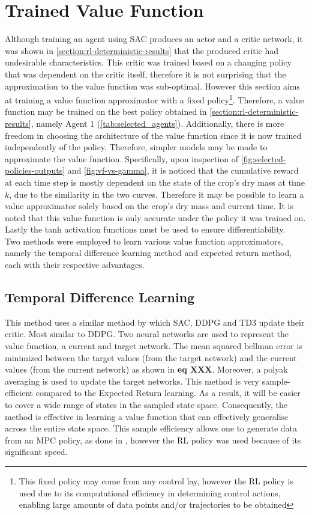 \section{Trained Value Function}
\label{section:trained-vf}

Although training an agent using SAC produces an actor and a critic network, it was shown in \autoref{section:rl-deterministic-results} that the produced critic had undesirable characteristics.
This critic was trained based on a changing policy that was dependent on the critic itself, therefore it is not surprising that the approximation to the value function was sub-optimal. However this section aims at training a value function approximator with a fixed policy\footnote{This fixed policy may come from any control lay, however the RL policy is used due to its computational efficiency in determining control actions, enabling large amounts of data points and/or trajectories to be obtained}. Therefore, a value function may be trained on the best policy obtained in \autoref{section:rl-deterministic-results}, namely Agent 1 (\autoref{tab:selected_agents}). Additionally, there is more freedom in choosing the architecture of the value function since it is now trained independently of the policy. Therefore, simpler models may be made to approximate the value function. Specifically, upon inspection of \autoref{fig:selected-policies-outputs} and \autoref{fig:vf-vs-gamma}, it is noticed that the cumulative reward at each time step is mostly dependent on the state of the crop's dry mass at time $k$, due to the similarity in the two curves. Therefore it may be possible to learn a value approximator solely based on the crop's dry mass and current time. It is noted that this value function is only accurate under the policy it was trained on. Lastly the tanh activation functions must be used to ensure differentiability.\\
Two methods were employed to learn various value function approximators, namely the temporal difference learning method and expected return method, each with their respective advantages.


\subsection{Temporal Difference Learning}
\label{ssection:td-learning}
This method uses a similar method by which SAC, DDPG and TD3 update their critic. Most similar to DDPG. Two neural networks are used to represent the value function, a current and target network. The mean squared bellman error is minimized between the target values (from the target network) and the current values (from the current network) as shown in \textbf{eq XXX}. Moreover, a polyak averaging is used to update the target networks. This method is very sample-efficient compared to the Expected Return learning. As a result, it will be easier to cover a wide range of states in the sampled state space. Consequently, the method is effective in learning a value function that can effectively generalise across the entire state space. This sample efficiency allows one to generate data from an MPC policy, as done in \cite{linReinforcementLearningBasedModel2023}, however the RL policy was used because of its significant speed.

